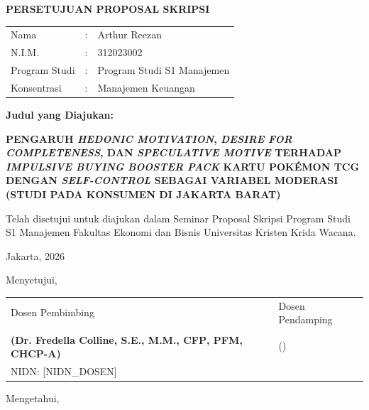 \documentclass[12pt,a4paper]{article}
\numberwithin{equation}{section}
\numberwithin{table}{section}
\numberwithin{figure}{section}
\newcommand{\prodi}{Program Studi S1 Manajemen}
\newcommand{\konsentrasi}{Manajemen Keuangan}
\newcommand{\namamahasiswa}{Arthur Reezan}
\newcommand{\nim}{312023002}
\newcommand{\dosbim}{Dr. Fredella Colline, S.E., M.M., CFP\textsuperscript{\textregistered}, PFM, CHCP-A}
\newcommand{\nidn}{[NIDN\_DOSEN]}
\newcommand{\judulskripsi}{PENGARUH \emph{HEDONIC MOTIVATION}, \emph{DESIRE FOR COMPLETENESS}, DAN \emph{SPECULATIVE MOTIVE} TERHADAP \emph{IMPULSIVE BUYING} \emph{BOOSTER PACK} KARTU POK\'EMON TCG DENGAN \emph{SELF-CONTROL} SEBAGAI VARIABEL MODERASI (STUDI PADA KONSUMEN DI JAKARTA BARAT)}
\begin{document}
\newpage
\thispagestyle{frontmatter}
{}
\begin{center}
  {\large\bfseries PERSETUJUAN PROPOSAL SKRIPSI}
\end{center}

\vspace{0.6cm}
\noindent
\begin{tabular}{lll}
  Nama          & : & \namamahasiswa \\
  N.I.M.        & : & \nim \\
  Program Studi & : & \prodi \\
  Konsentrasi   & : & \konsentrasi \\
\end{tabular}

\vspace{0.5cm}
\noindent \textbf{Judul yang Diajukan:}

\vspace{0.2cm}
\begin{flushleft}
  \bfseries\judulskripsi
\end{flushleft}

\vspace{0.4cm}
\noindent Telah disetujui untuk diajukan dalam Seminar Proposal Skripsi Program Studi S1 Manajemen Fakultas Ekonomi dan Bisnis Universitas Kristen Krida Wacana.

\vspace{0.6cm}
\noindent Jakarta, \underline{\hspace{3cm}} 2026

\vspace{0.5cm}
\noindent Menyetujui,

\vspace{0.3cm}
\noindent
\begin{tabular}{p{6.5cm} p{6.5cm}}
  Dosen Pembimbing & Dosen Pendamping \\[2.0cm]
  \textbf{(\dosbim)} & (\underline{\hspace{4cm}}) \\
  NIDN: \nidn & \\
\end{tabular}

\vspace{0.6cm}
\noindent Mengetahui,
\end{document}
